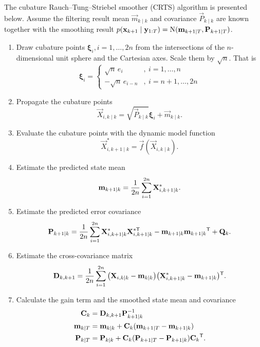 The cubature Rauch--Tung--Striebel smoother (CRTS) algorithm \citep[see][]{Solin:2010} is presented below. Assume the filtering result mean $\vec{m}_{k \mid k}$ and covariance $\vec{P}_{k \mid k}$ are known together with the smoothing result $ p(\vec{x}_{k+1} \mid \vec{y}_{1:T}) = \N(\vec{m}_{k+1 \mid T},\vec{P}_{k+1 \mid T})$.

\begin{enumerate}

  \item Draw cubature points $\boldsymbol{\xi}_i, i=1,\ldots,2n$ from the intersections of the $n$-dimensional unit sphere and the Cartesian axes. Scale them by $\sqrt{n}$. That is
%
    $$ \boldsymbol{\xi}_i =
	\begin{cases} 
	    \sqrt{n} \, e_i      & ,\: i = 1,\ldots,n \\
	    -\sqrt{n} \, e_{i-n} & ,\: i = n+1,\ldots,2n
	\end{cases}
 $$

  \item Propagate the cubature points%
%
    $$ \vec{X}_{i,k \mid k} = \sqrt{\vec{P}_{k \mid k}} \boldsymbol{\xi}_i + \vec{m}_{k \mid k}. $$

  \item Evaluate the cubature points with the dynamic model function%
%
    $$ \vec{X}_{i,k+1 \mid k}^* = \vec{f}(\vec{X}_{i,k \mid k}). $$

  \item Estimate the predicted state mean%
%
    $$ \vec{m}_{k+1 \mid k}  = {1 \over 2 n} \sum_{i=1}^{2 n} \vec{X}_{i,k+1 \mid k}^*. $$

  \item Estimate the predicted error covariance%
%
    $$ \vec{P}_{k+1 \mid k} = {1 \over 2 n} \sum_{i=1}^{2 n} \vec{X}_{i,k+1 \mid k}^* \vec{X}_{i,k+1 \mid k}^{*\mathsf{T}} - \vec{m}_{k+1 \mid k} \vec{m}_{k+1 \mid k}\T + \vec{Q}_{k}.$$ 

  \item Estimate the cross-covariance matrix
%
    $$ \vec{D}_{k , k+1} = {1 \over 2 n} \sum_{i=1}^{2 n} \big(\vec{X}_{i,k \mid k} - \vec{m}_{k \mid k}\big) \\ \big(\vec{X}_{i,k+1 \mid k}^* - \vec{m}_{k+1 \mid k}\big)\T. $$

  \item Calculate the gain term and the smoothed state mean and covariance%
%
     \begin{align*}
       \vec{C}_k &= \vec{D}_{k , k+1} \vec{P}_{k+1 \mid k}^{-1} \\
       \vec{m}_{k \mid T} &= \vec{m}_{k \mid k} + \vec{C}_k(\vec{m}_{k+1 \mid T} - \vec{m}_{k+1 \mid k}) \\
       \vec{P}_{k \mid T} &= \vec{P}_{k \mid k} + \vec{C}_k (\vec{P}_{k+1 \mid T} - \vec{P}_{k+1 \mid k}) \vec{C}_k\T.
     \end{align*}


\end{enumerate}





